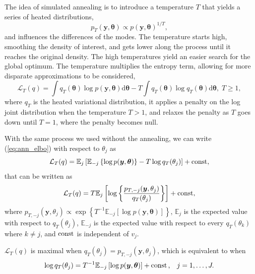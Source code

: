 \documentclass[a4paper, 11pt]{report}
\numberwithin{equation}{chapter}
\DeclareMathOperator*{\const}{{\rm const}}
\begin{document}
The idea of simulated annealing is to introduce a temperature $T$ that yields a series of heated distributions,
\begin{equation*}
p_T(\boldsymbol{y},\boldsymbol{\theta}) \propto p(\boldsymbol{y},\boldsymbol{\theta})^{1/T},
\end{equation*}
and influences the differences of the modes. The temperature starts high, smoothing the density of interest, and gets lower along the process until it reaches the original density. The high temperatures yield an easier search for the global optimum. The temperature multiplies the entropy term, allowing for more disparate approximations to be considered,
\begin{equation}
\mathcal{L}_T(q) = \int q_T(\boldsymbol{\theta}) \log p(\boldsymbol{y},\boldsymbol{\theta})\mathrm{d}\boldsymbol{\theta} - T \int q_T(\boldsymbol{\theta}) \log q_T(\boldsymbol{\theta}) \mathrm{d}\boldsymbol{\theta},\; T\geq 1,
\label{eq:ann_elbo}
\end{equation}
where $q_T$ is the heated variational distribution, it applies a penalty on the log joint distribution when the temperature $T > 1$, and relaxes the penalty as $T$ goes down until $T = 1$, where the penalty becomes null.

With the same process we used without the annealing, we can write (\ref{eq:ann_elbo}) with respect to $\theta_j$ as
\begin{equation*}
\mathcal{L}_T(q) = \mathbb{E}_j\left[\mathbb{E}_{-j}\left\lbrace \log p(\boldsymbol{y},\boldsymbol{\theta})\right\rbrace - T \log q_T(\theta_j)\right]+ \const,
\end{equation*}
that can be written as
\begin{equation*}
\mathcal{L}_T(q) = T\mathbb{E}_j\left[\log\left\lbrace\frac{p_{T, -j}(\boldsymbol{y}, \theta_j)}{q_T(\theta_j)}\right\rbrace\right] + \const,	
\end{equation*}
where $p_{T, -j}(\boldsymbol{y},\theta_j) \propto \exp\left\lbrace T^{-1}\mathbb{E}_{-j}\left[\log p(\boldsymbol{y},\boldsymbol{\theta})\right]\right\rbrace$, $\mathbb{E}_j$ is the expected value with respect to $q_T(\theta_j)$, $\mathbb{E}_{-j}$ is the expected value with respect to every $ q_T(\theta_k)$ where $k \neq j$, and $\const$ is independent of $v_j$.

$\mathcal{L}_T(q)$ is maximal when $q_T(\theta_j) = p_{T,-j}(\boldsymbol{y},\theta_j)$, which is equivalent to when
\begin{equation*}
\log q_T(\theta_j) = T^{-1} \mathbb{E}_{-j}\left[\log p(\boldsymbol{y}, \boldsymbol{\theta})\right] + \const\text{,}\quad j=1,\dots,J.
\end{equation*}
\end{document}
